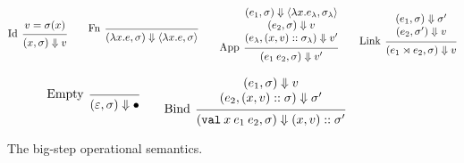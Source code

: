 \documentclass{article}
\theoremstyle{definition}
\newcommand*{\cons}{::}
\newcommand*{\ctx}{\sigma}
\newcommand*{\semarrow}{\Downarrow}
\newcommand*{\link}[2]{{#1}\rtimes{#2}}
\newcommand*{\Lete}{\mathtt{val}}
\begin{document}
\begin{figure}[h!]
	\footnotesize
	\begin{flushright}
		\fbox{$(e,\ctx)\semarrow v$}
	\end{flushright}
	\centering
	\vspace{0pt} %
	\[
		\begin{prooftree}
			\hypo{v=\ctx(x)}
			\infer[left label=Id]1{
			(x, \ctx)
			\semarrow
			v
			}
		\end{prooftree}\qquad
		\begin{prooftree}
			\infer[left label=Fn]0{
			(\lambda x.e, \ctx)
			\semarrow
			\langle\lambda x.e, \ctx\rangle
			}
		\end{prooftree}\qquad
		\begin{prooftree}
			\hypo{
				\begin{matrix}
					(e_{1}, \ctx)
					\semarrow
					\langle\lambda x.e_{\lambda}, \ctx_{\lambda}\rangle \\
					(e_{2}, \ctx)
					\semarrow
					v                                                   \\
					(e_{\lambda}, (x, v)\cons \ctx_{\lambda})
					\semarrow
					v'
				\end{matrix}
			}
			\infer[left label={App}]1{
			(e_{1}\:e_{2}, \ctx)
			\semarrow
			v'
			}
		\end{prooftree}\qquad
		\begin{prooftree}
			\hypo{
				\begin{matrix}
					(e_{1}, \ctx)
					\semarrow
					\ctx' \\
					(e_{2}, \ctx')
					\semarrow
					v
				\end{matrix}
			}
			\infer[left label=Link]1{
			(\link{e_{1}}{e_{2}}, \ctx)
			\semarrow
			v
			}
		\end{prooftree}
	\]

	\[
		\begin{prooftree}
			\infer[left label=Empty]0{
			(\varepsilon, \ctx)
			\semarrow
			\bullet
			}
		\end{prooftree}\qquad
		\begin{prooftree}
			\hypo{
				\begin{matrix}
					(e_{1}, \ctx)
					\semarrow
					v \\
					(e_{2}, (x, v)\cons \ctx)
					\semarrow
					\ctx'
				\end{matrix}
			}
			\infer[left label=Bind]1{
			(\Lete\:x\:e_1\:e_2, \ctx)
			\semarrow
			(x,v)\cons\ctx'
			}
		\end{prooftree}
	\]
	\caption{The big-step operational semantics.}
	\label{fig:extsimpreach}
\end{figure}
\end{document}
